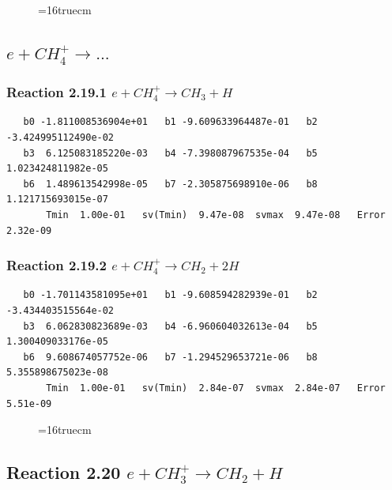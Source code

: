 \documentclass[12pt,dvipdfmx]{article}
\begin{document}
\begin{figure} \label{met.2_2.18}
\epsfxsize=16truecm
\end{figure}
\newpage

\subsection{
$e + CH_4^+ \rightarrow ... $
}

\subsubsection{
Reaction 2.19.1    $e + CH_4^+ \rightarrow CH_3 + H $
}

\begin{small}\begin{verbatim}
   b0 -1.811008536904e+01   b1 -9.609633964487e-01   b2 -3.424995112490e-02
   b3  6.125083185220e-03   b4 -7.398087967535e-04   b5  1.023424811982e-05
   b6  1.489613542998e-05   b7 -2.305875698910e-06   b8  1.121715693015e-07
       Tmin  1.00e-01   sv(Tmin)  9.47e-08  svmax  9.47e-08   Error  2.32e-09
\end{verbatim}\end{small}

\subsubsection{
Reaction 2.19.2    $e + CH_4^+ \rightarrow CH_2 + 2H $
}

\begin{small}\begin{verbatim}
   b0 -1.701143581095e+01   b1 -9.608594282939e-01   b2 -3.434403515564e-02
   b3  6.062830823689e-03   b4 -6.960604032613e-04   b5  1.300409033176e-05
   b6  9.608674057752e-06   b7 -1.294529653721e-06   b8  5.355898675023e-08
       Tmin  1.00e-01   sv(Tmin)  2.84e-07  svmax  2.84e-07   Error  5.51e-09
\end{verbatim}\end{small}

\begin{figure} \label{met.2_2.19}
\epsfxsize=16truecm
\end{figure}
\newpage

\subsection{
Reaction 2.20     $e + CH_3^+ \rightarrow CH_2 + H $
}
\end{document}
